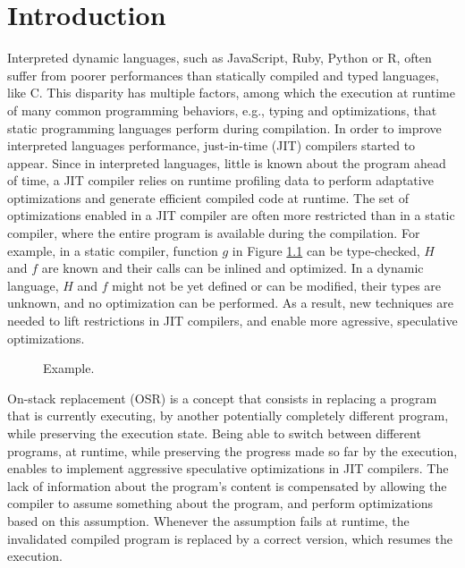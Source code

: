 
\chapter{Introduction} %

\label{Chapter1} %


\newcommand{\keyword}[1]{\textbf{#1}}
\newcommand{\tabhead}[1]{\textbf{#1}}
\newcommand{\code}[1]{\texttt{#1}}
\newcommand{\file}[1]{\texttt{\bfseries#1}}
\newcommand{\option}[1]{\texttt{\itshape#1}}


Interpreted dynamic languages, such as JavaScript, Ruby, Python or R, often suffer from poorer performances than statically compiled and typed languages, like C.
This disparity has multiple factors, among which the execution at runtime of many common programming behaviors, e.g., typing and optimizations, that static programming languages perform during compilation.
In order to improve interpreted languages performance, just-in-time (JIT) compilers started to appear.
Since in interpreted languages, little is known about the program ahead of time, a JIT compiler relies on runtime profiling data to perform adaptative optimizations and generate efficient compiled code at runtime.
The set of optimizations enabled in a JIT compiler are often more restricted than in a static compiler, where the entire program is available during the compilation.
For example, in a static compiler, function $g$ in Figure \ref{fig:example} can be type-checked, $H$ and $f$ are known and their calls can be inlined and optimized.
In a dynamic language, $H$ and $f$ might not be yet defined or can be modified, their types are unknown, and no optimization can be performed.
As a result, new techniques are needed to lift restrictions in JIT compilers, and enable more agressive, speculative optimizations.\\

\begin{figure}[h]
\caption{Example.}
\label{fig:example}
\end{figure}

On-stack replacement (OSR) is a concept that consists in replacing a program that is currently executing, by another potentially completely different program, while preserving the execution state.
Being able to switch between different programs, at runtime, while preserving the progress made so far by the execution, enables to implement aggressive speculative optimizations in JIT compilers.
The lack of information about the program's content is compensated by allowing the compiler to assume something about the program, and perform optimizations based on this assumption.
Whenever the assumption fails at runtime, the invalidated compiled program is replaced by a correct version, which resumes the execution.\\

